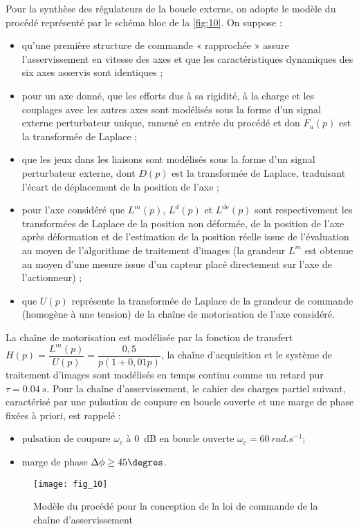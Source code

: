 Pour la synthèse des régulateurs de la boucle externe, on adopte le modèle du procédé représenté par le schéma
bloc de la \autoref{fig:10}. On suppose :
\begin{itemize}
\item qu’une première structure de commande « rapprochée » assure l’asservissement en vitesse des axes et que
les caractéristiques dynamiques des six axes asservis sont identiques ;
\item pour un axe donné, que les efforts dus à sa rigidité, à la charge et les couplages avec les autres axes sont
modélisés sous la forme d’un signal externe perturbateur unique, ramené en entrée du procédé et don $F_u(p)$
est la transformée de Laplace ;
\item que les jeux dans les liaisons sont modélisés sous la forme d’un signal perturbateur externe, dont $D(p)$ est
la transformée de Laplace, traduisant l’écart de déplacement de la position de l’axe ;
\item pour l’axe considéré que $L^m(p)$, $L^d(p)$ et $L^{\text{de}}(p)$ sont respectivement les transformées de Laplace de la
position non déformée, de la position de l’axe après déformation et de l’estimation de la position réelle issue
de l’évaluation au moyen de l’algorithme de traitement d’images (la grandeur $L^m$  est obtenue au moyen
d’une mesure issue d’un capteur placé directement sur l’axe de l’actionneur) ;
\item que $U(p)$ représente la transformée de Laplace de la grandeur de commande (homogène à une tension) de
la chaîne de motorisation de l’axe considéré.
\end{itemize}
La chaîne de motorisation est modélisée par la fonction de transfert $H(p) = \dfrac{L^m(p)}{U(p)} = \dfrac{0,5}{p\left(1+0,01 p\right)}$, la chaîne
d’acquisition et le système de traitement d’images sont modélisés en temps continu comme un retard pur $\tau =\SI{0,04}{s}$. Pour la chaîne d’asservissement, le cahier des charges partiel suivant, caractérisé par une pulsation
de coupure en boucle ouverte et une marge de phase fixées à priori, est rappelé :
\begin{itemize}
\item pulsation de coupure $\omega_c$ à \SI{0}{dB} en boucle ouverte $\omega_c = \SI{60}{rad.s^{-1}}$;
\item marge de phase $\Delta \phi \geq 45 \degres$.
\end{itemize}

\begin{figure}[H]
\centering
\texttt{[image: fig\_10]}
\caption{\label{fig:10}  Modèle du procédé pour la conception de la loi de commande de la chaîne d’asservissement}
\end{figure}


